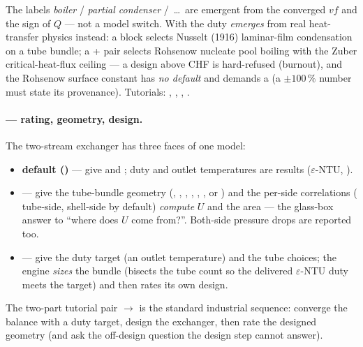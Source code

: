 \documentclass[11pt,a4paper]{article}
\begin{document}
The labels \emph{boiler} / \emph{partial condenser} /~\dots\ are
emergent from the converged $vf$ and the sign of $Q$ --- not a model
switch.  With  the duty \emph{emerges} from real
heat-transfer physics instead: a  block selects
Nusselt (1916) laminar-film condensation on a tube bundle; a
 +  pair selects Rohsenow
nucleate pool boiling with the Zuber critical-heat-flux ceiling --- a
design above CHF is hard-refused (burnout), and the Rohsenow surface
constant  has \emph{no default} and demands a
 (a $\pm 100\,\%$ number must state its provenance).
Tutorials: ,
, ,
.

\paragraph{ --- rating, geometry, design.}  The
two-stream exchanger has three faces of one model:

\begin{itemize}[leftmargin=*,nosep,topsep=2pt]
  \item \textbf{default ()} --- give  and
        ; duty and outlet temperatures are results
        ($\varepsilon$-NTU, ).
  \item \textbf{} --- give the tube-bundle geometry
        (, , ,
        , , ,
         or ) and the per-side
        correlations ( tube-side, 
        shell-side by default) \emph{compute} $U$ and the area --- the
        glass-box answer to ``where does $U$ come from?''.  Both-side
        pressure drops are reported too.
  \item \textbf{} --- give the duty target (an outlet
        temperature) and the tube choices; the engine \emph{sizes} the
        bundle (bisects the tube count so the delivered $\varepsilon$-NTU
        duty meets the target) and then rates its own design.
\end{itemize}

The two-part tutorial pair
 $\to$
 is the standard industrial sequence:
converge the balance with a duty target, design the exchanger, then
rate the designed geometry (and ask the off-design question the design
step cannot answer).
\end{document}
